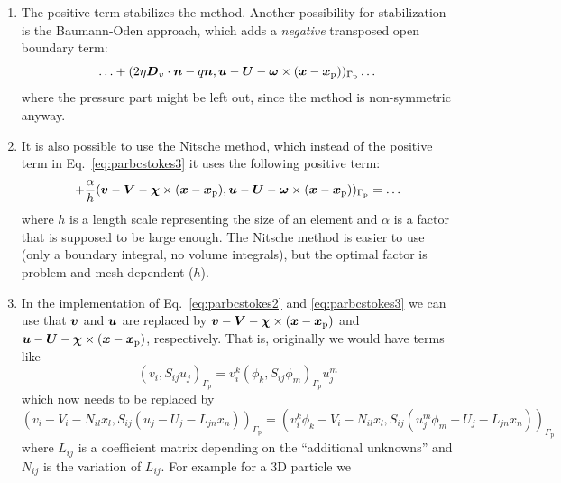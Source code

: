 \begin{enumerate}
\begin{multline}
(\phi_m,[\vek n(\vec u-\vek U-\vek\omega\times(\vek x - \vek
x_\text{p}))+(\vec u-\vek U-\vek\omega\times(\vek x - \vek
x_\text{p}))\vec n])_{\Gamma_{\text{p}}}\\
\end{multline}
   \item The positive term stabilizes the method. Another possibility for
stabilization is the Baumann-Oden approach, which adds a \emph{negative}
         transposed open
         boundary term:
\begin{equation}
  \ldots  +(2\eta \boldsymbol{D}_v\cdot\boldsymbol{n}-q\boldsymbol{n},
 \boldsymbol{u}-\boldsymbol{U}-\boldsymbol{\omega}\times(\boldsymbol{x} -
      \boldsymbol{x}_\text{p}))_{\Gamma_{\text{p}}} \dots
\end{equation}
where the pressure part might be left out, since the method is non-symmetric
anyway.
  \item
It is also possible to use the
Nitsche method, which instead of the positive term in
Eq.~\eqref{eq:parbcstokes3}
it uses the following positive term:
\begin{equation}
   + \frac\alpha{h}(\boldsymbol{v}-\boldsymbol{V}-\boldsymbol{\chi}\times(\boldsymbol{x} - \boldsymbol{x}_\text{p}),
\boldsymbol{u}-\boldsymbol{U}-\boldsymbol{\omega}\times(\boldsymbol{x} - \boldsymbol{x}_\text{p}))_{\Gamma_\text{p}} = \ldots
\label{eq:parbcNitsche}
\end{equation}
where $h$ is a length scale representing the size of an element and
$\alpha$ is a factor that is supposed to be large enough. The Nitsche method is
easier to use (only a boundary integral, no volume integrals), but the optimal
factor is problem and mesh dependent ($h$).
\item
In the implementation of Eq.~\eqref{eq:parbcstokes2} and
\eqref{eq:parbcstokes3} we can use that $\boldsymbol{v}$ and $\boldsymbol{u}$ are replaced by
$\boldsymbol{v}- \boldsymbol{V}-\boldsymbol{\chi}\times(\boldsymbol{x}-\boldsymbol{x}_\text{p})$ and
$\boldsymbol{u}- \boldsymbol{U}-\boldsymbol{\chi}\times(\boldsymbol{x}-\boldsymbol{x}_\text{p})$, respectively.
That is, originally we would have terms like
\begin{equation}
   (v_i,S_{ij}u_j)_{\Gamma_\text{p}}=v_i^k(\phi_k,S_{ij}\phi_m)_{\Gamma_\text{p}}u_j^m
\end{equation}
which now needs to be replaced by
\begin{equation}
   (v_i-V_i-N_{il}x_l,S_{ij}(u_j-U_j-L_{jn}x_n))_{\Gamma_\text{p}}=
 (v_i^k\phi_k-V_i-N_{il}x_l,S_{ij}(u_j^m\phi_m -U_j-L_{jn}x_n))_{\Gamma_\text{p}}
\label{eq:particlestable}
\end{equation}
where $L_{ij}$ is a coefficient matrix depending on the ``additional unknowns''
and $N_{ij}$ is the variation of $L_{ij}$. For example for a 3D particle we

\end{enumerate}
